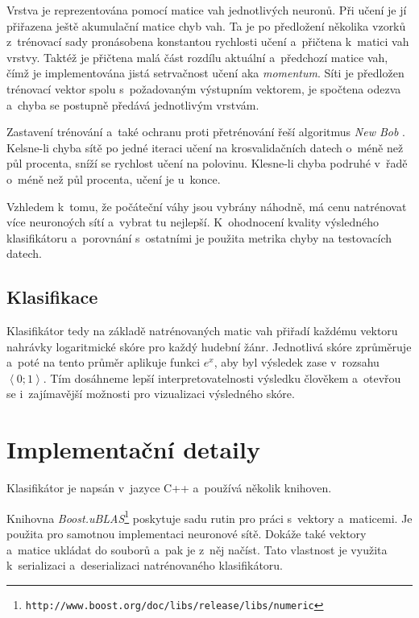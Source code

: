 \documentclass[10pt,a4paper,twocolumn]{article}
\begin{document}
Vrstva je reprezentována pomocí matice vah jednotlivých neuronů.
Při učení je jí přiřazena ještě akumulační matice chyb vah.
Ta je po předložení několika vzorků z~trénovací sady
pronásobena konstantou rychlosti učení a~přičtena k~matici vah vrstvy.
Taktéž je přičtena malá část rozdílu aktuální a~předchozí matice vah,
čímž je implementována jistá setrvačnost učení aka \emph{momentum}.
Síti je předložen trénovací vektor spolu s~požadovaným výstupním vektorem,
je spočtena odezva a~chyba se postupně předává jednotlivým vrstvám.

Zastavení trénování a~také ochranu proti přetrénování řeší algoritmus \emph{New Bob} \cite{newbob}.
Kelsne-li chyba sítě po jedné iteraci učení na krosvalidačních datech o~méně než půl procenta,
sníží se rychlost učení na polovinu. Klesne-li chyba podruhé v~řadě o~méně než půl procenta,
učení je u~konce.

Vzhledem k~tomu, že počáteční váhy jsou vybrány náhodně,
má cenu natrénovat více neuronoých sítí a~vybrat tu nejlepší.
K~ohodnocení kvality výsledného klasifikátoru a~porovnání s~ostatními
je použita metrika chyby na testovacích datech.

\subsection{Klasifikace}

Klasifikátor tedy na základě natrénovaných matic vah přiřadí každému vektoru nahrávky logaritmické skóre pro každý
hudební žánr. Jednotlivá skóre zprůměruje a~poté na tento průměr aplikuje funkci $e^x$,
aby byl výsledek zase v~rozsahu $\left<0; 1\right>$.
Tím dosáhneme lepší interpretovatelnosti výsledku člověkem a~otevřou se i~zajímavější možnosti pro vizualizaci
výsledného skóre.

\section{Implementační detaily}
\label{impl}

Klasifikátor je napsán v~jazyce C++ a~používá několik knihoven.

Knihovna \emph{Boost.uBLAS}\footnote{\texttt{http://www.boost.org/doc/libs/release/libs/numeric}}
poskytuje sadu rutin pro práci s~vektory a~maticemi.
Je použita pro samotnou implementaci neuronové sítě.
Dokáže také vektory a~matice ukládat do souborů a~pak je z~něj načíst.
Tato vlastnost je využita k~serializaci a~deserializaci natrénovaného klasifikátoru.
\end{document}
